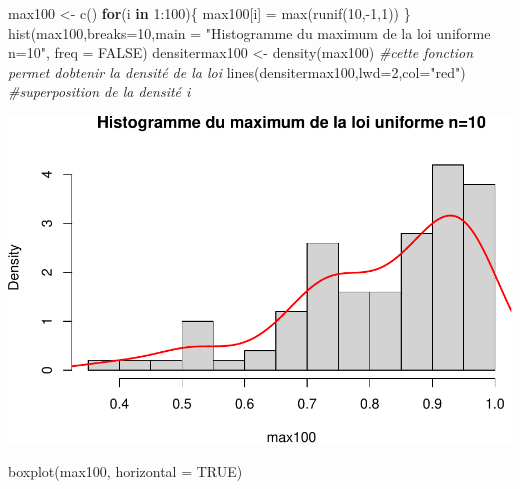 \documentclass[
]{article}
\newenvironment{Shaded}{\begin{snugshade}}{\end{snugshade}}
\newcommand{\AttributeTok}[1]{\textcolor[rgb]{0.77,0.63,0.00}{#1}}
\newcommand{\CommentTok}[1]{\textcolor[rgb]{0.56,0.35,0.01}{\textit{#1}}}
\newcommand{\ConstantTok}[1]{\textcolor[rgb]{0.00,0.00,0.00}{#1}}
\newcommand{\ControlFlowTok}[1]{\textcolor[rgb]{0.13,0.29,0.53}{\textbf{#1}}}
\newcommand{\DecValTok}[1]{\textcolor[rgb]{0.00,0.00,0.81}{#1}}
\newcommand{\FunctionTok}[1]{\textcolor[rgb]{0.00,0.00,0.00}{#1}}
\newcommand{\NormalTok}[1]{#1}
\newcommand{\OtherTok}[1]{\textcolor[rgb]{0.56,0.35,0.01}{#1}}
\newcommand{\SpecialCharTok}[1]{\textcolor[rgb]{0.00,0.00,0.00}{#1}}
\newcommand{\StringTok}[1]{\textcolor[rgb]{0.31,0.60,0.02}{#1}}
\begin{document}
\begin{Shaded}
\begin{Highlighting}[]
\NormalTok{max100 }\OtherTok{\textless{}{-}} \FunctionTok{c}\NormalTok{() }
\ControlFlowTok{for}\NormalTok{(i }\ControlFlowTok{in} \DecValTok{1}\SpecialCharTok{:}\DecValTok{100}\NormalTok{)\{}
\NormalTok{ max100[i] }\OtherTok{=} \FunctionTok{max}\NormalTok{(}\FunctionTok{runif}\NormalTok{(}\DecValTok{10}\NormalTok{,}\SpecialCharTok{{-}}\DecValTok{1}\NormalTok{,}\DecValTok{1}\NormalTok{)) }
\NormalTok{\}}
\FunctionTok{hist}\NormalTok{(max100,}\AttributeTok{breaks=}\DecValTok{10}\NormalTok{,}\AttributeTok{main =} \StringTok{"Histogramme du maximum de la loi uniforme n=10"}\NormalTok{, }\AttributeTok{freq =} \ConstantTok{FALSE}\NormalTok{)}
\NormalTok{densitermax100 }\OtherTok{\textless{}{-}} \FunctionTok{density}\NormalTok{(max100) }\CommentTok{\#cette fonction permet d\textquotesingle{}obtenir la densité de la loi}
\FunctionTok{lines}\NormalTok{(densitermax100,}\AttributeTok{lwd=}\DecValTok{2}\NormalTok{,}\AttributeTok{col=}\StringTok{"red"}\NormalTok{) }\CommentTok{\#superposition de la densité i}
\end{Highlighting}
\end{Shaded}

\includegraphics{tp2_files/figure-latex/unnamed-chunk-5-1.pdf}

\begin{Shaded}
\begin{Highlighting}[]
\FunctionTok{boxplot}\NormalTok{(max100, }\AttributeTok{horizontal =} \ConstantTok{TRUE}\NormalTok{)}
\end{Highlighting}
\end{Shaded}
\end{document}
